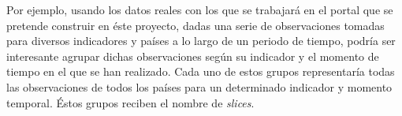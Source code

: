 Por ejemplo, usando los datos reales con los que se trabajará en el portal que se pretende construir en éste proyecto, dadas una serie de observaciones tomadas para diversos indicadores y países a lo largo de un periodo de tiempo, podría ser interesante agrupar dichas observaciones según su indicador y el momento de tiempo en el que se han realizado.  Cada uno de estos grupos representaría todas las observaciones de todos los países para un determinado indicador y momento temporal.  Éstos grupos reciben el nombre de \textit{slices}.


